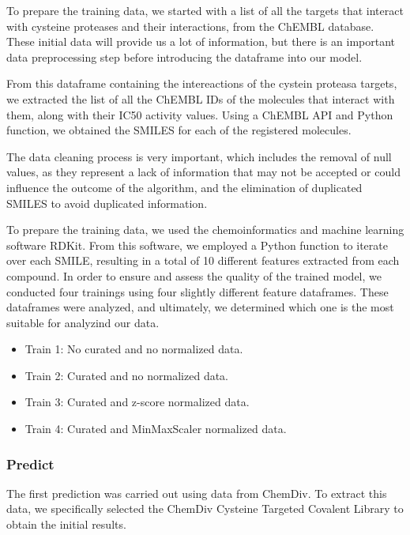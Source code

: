 \documentclass[final,times,twocolumn,article]{elsarticle}
\begin{document}
To prepare the training data, we started with a list of all the targets that interact with cysteine proteases and their interactions, from the ChEMBL database. These initial data will provide us a lot of information, but there is an important data preprocessing step before introducing the dataframe into our model. 

From this dataframe containing the intereactions of the cystein proteasa targets, we extracted the list of all the ChEMBL IDs of the molecules that interact with them, along with their IC50 activity values. Using a ChEMBL API and Python function, we obtained the SMILES for each of the registered molecules. 

The data cleaning process is very important, which includes the removal of null values, as they represent a lack of information that may not be accepted or could influence the outcome of the algorithm, and the elimination of duplicated SMILES to avoid duplicated information. 

To prepare the training data, we used the chemoinformatics and machine learning software RDKit\cite{rdkit}. From this software, we employed a Python function to iterate over each SMILE, resulting in a total of 10 different features extracted from each compound. 
In order to ensure and assess the quality of the trained model, we conducted four trainings using four slightly different feature dataframes. These dataframes were analyzed, and ultimately, we determined which one is the most suitable for analyzind our data. 

\begin{itemize}
\item Train 1: No curated and no normalized data.
\item Train 2: Curated and no normalized data.
\item Train 3: Curated and z-score normalized data.
\item Train 4: Curated and MinMaxScaler normalized data.
\end{itemize}
\subsubsection{Predict}

The first prediction was carried out using data from ChemDiv. To extract this data, we specifically selected the ChemDiv Cysteine Targeted Covalent Library to obtain the initial results. 
\end{document}
